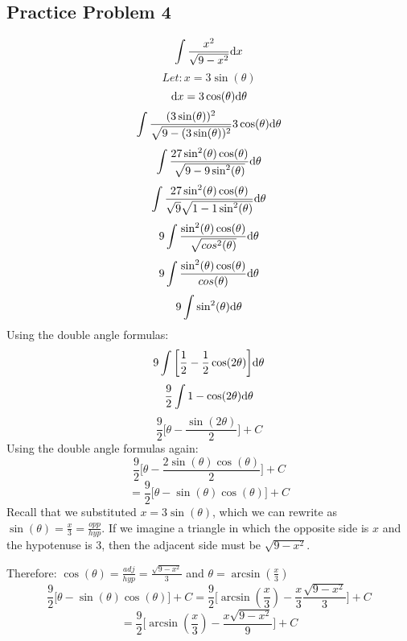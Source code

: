 \documentclass[letterpaper, 12pt]{math}
\begin{document}
\subsection*{Practice Problem 4}
\[ \int{\frac{x^{2}}{\sqrt{9-x^{2}}}\mathrm{d}{x}} \]
\[ Let: x = 3\sin(\theta) \]
\[ \mathrm{d}{x} = 3\cos(\theta)\mathrm{d}{\theta} \]
\[ \int{\frac{(3\sin(\theta))^{2}}
   {\sqrt{9-(3\sin(\theta))^{2}}}3\cos(\theta)\mathrm{d}{\theta}} \]
\[ \int{\frac{27\sin^{2}(\theta)\cos(\theta)}
   {\sqrt{9-9\sin^{2}(\theta)}}\mathrm{d}{\theta}} \]
\[ \int{\frac{27\sin^{2}(\theta)\cos(\theta)}
   {\sqrt{9}\sqrt{1-1\sin^{2}(\theta)}}\mathrm{d}{\theta}} \]
\[ 9\int{\frac{\sin^{2}(\theta)\cos(\theta)}
   {\sqrt{cos^{2}(\theta)}}\mathrm{d}{\theta}} \]
\[ 9\int{\frac{\sin^{2}(\theta)\cos(\theta)}{cos(\theta)}\mathrm{d}{\theta}} \]
\[ 9\int{\sin^{2}(\theta)\mathrm{d}{\theta}} \]
Using the double angle formulas:
\[ 9\int{\bigg[\frac{1}{2}-\frac{1}{2}\cos(2\theta)\bigg]\mathrm{d}{\theta}} \]
\[ \frac{9}{2}\int{1-\cos(2\theta)\mathrm{d}{\theta}} \]
\[ \frac{9}{2}\bigg[\theta-\frac{\sin(2\theta)}{2}\bigg]+C \]
Using the double angle formulas again:
\[ \frac{9}{2}\bigg[\theta-\frac{2\sin(\theta)\cos(\theta)}{2}\bigg]+C \]
\[ = \frac{9}{2}\bigg[\theta-\sin(\theta)\cos(\theta)\bigg]+C \]
Recall that we substituted \( x = 3\sin(\theta) \), which we can rewrite as
\( \sin(\theta) = \frac{x}{3} = \frac{opp}{hyp} \). If we imagine a triangle in
which the opposite side is \( x \) and the hypotenuse is 3, then the adjacent
side must be \( \sqrt{9-x^{2}} \).
\begin{center}
\end{center}
Therefore: \( \cos(\theta) = \frac{adj}{hyp} = \frac{\sqrt{9-x^{2}}}{3} \) and
\( \theta = \arcsin(\frac{x}{3}) \)
\[ \frac{9}{2}\bigg[\theta-\sin(\theta)\cos(\theta)\bigg]+C =
   \frac{9}{2}\bigg[\arcsin(\frac{x}{3})-
   \frac{x}{3}\frac{\sqrt{9-x^{2}}}{3}\bigg]+C \]
\[ = \frac{9}{2}\bigg[\arcsin(\frac{x}{3})-
   \frac{x\sqrt{9-x^{2}}}{9}\bigg]+C \]
\end{document}
